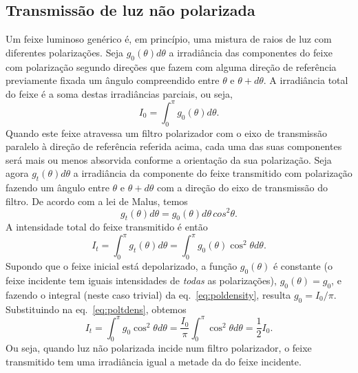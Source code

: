 \subsection{Transmissão de luz não polarizada}
Um feixe luminoso genérico é, em princípio, uma mistura de raios de luz com
diferentes polarizações. Seja $g_0(\theta)d\theta$ a irradiância das
componentes do feixe com polarização segundo direções que fazem com alguma
direção de referência previamente fixada um ângulo compreendido entre $\theta$ e
$\theta+d\theta$. A irradiância total do feixe é a soma destas irradiâncias
parciais, ou seja,
\begin{equation}\label{eq:poldensity}
I_0=\int_0^{\pi} g_0(\theta) d\theta.
\end{equation}
Quando este feixe atravessa um filtro polarizador com o eixo de transmissão
paralelo à direção de referência referida acima, cada uma das suas componentes
será mais ou menos absorvida conforme a orientação da sua polarização. Seja
agora $g_t(\theta)d\theta$ a irradiância da componente do feixe transmitido
com polarização fazendo um ângulo entre $\theta$ e $\theta+d\theta$ com a 
direção do eixo de transmissão do filtro. De acordo com a lei de Malus, temos
\begin{equation*}
g_t(\theta)d\theta=g_0(\theta)d\theta\,cos^2\theta.
\end{equation*}
A intensidade total do feixe transmitido é então
\begin{equation}\label{eq:poltdens}
I_t=\int_0^\pi g_t(\theta)d\theta=\int_0^\pi g_0(\theta)\cos^2\theta d\theta.
\end{equation}
Supondo que o feixe inicial está depolarizado, a função $g_0(\theta)$ é
constante (o feixe incidente tem iguais intensidades de \emph{todas} as
polarizações), $g_0(\theta)=g_0$, e fazendo o integral (neste caso trivial) da
eq.~\eqref{eq:poldensity}, resulta $g_0=I_0/\pi$. Substituindo na
eq.~\eqref{eq:poltdens}, obtemos
\begin{equation*}
I_t=\int_0^\pi g_0\cos^2\theta d\theta=\frac{I_0}{\pi}\int_0^\pi\cos^2\theta
d\theta=\frac12 I_0.
\end{equation*}
Ou seja, quando luz não polarizada incide num filtro polarizador, o feixe
transmitido tem uma irradiância igual a metade da do feixe incidente.


